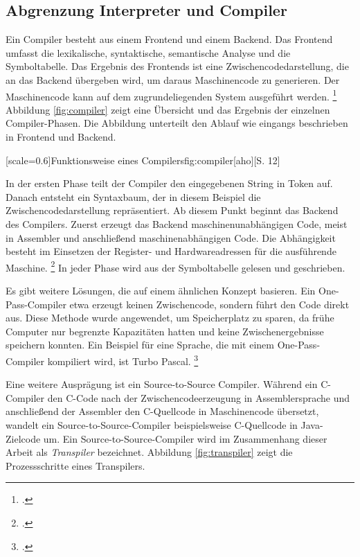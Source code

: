 \subsection{Abgrenzung Interpreter und Compiler}
  
Ein Compiler besteht aus einem Frontend und einem Backend. Das Frontend umfasst die lexikalische, syntaktische, semantische Analyse und die Symboltabelle.
Das Ergebnis des Frontends ist eine Zwischencodedarstellung, die an das Backend übergeben wird, um daraus Maschinencode zu generieren. Der Maschinencode kann auf dem zugrundeliegenden System ausgeführt werden. \footcite[Vgl. ][S.106ff. ]{aho}
Abbildung \ref{fig:compiler} zeigt eine Übersicht und das Ergebnis der einzelnen Compiler-Phasen. Die Abbildung unterteilt den Ablauf wie eingangs beschrieben in Frontend und Backend.

[scale=0.6]{Funktionsweise eines Compilers}{fig:compiler}[aho][S. 12]

In der ersten Phase teilt der Compiler den eingegebenen String in Token auf. Danach entsteht ein Syntaxbaum, der in diesem Beispiel die Zwischencodedarstellung repräsentiert. Ab diesem Punkt beginnt das Backend des Compilers. Zuerst erzeugt das Backend maschinenunabhängigen Code, meist in Assembler und anschließend maschinenabhängigen Code. Die Abhängigkeit besteht im Einsetzen der Register- und Hardwareadressen für die ausführende Maschine.  \footcite[Vgl. ][S.30ff. ]{aho}
In jeder Phase wird aus der Symboltabelle gelesen und geschrieben.

Es gibt weitere Lösungen, die auf einem ähnlichen Konzept basieren.
Ein One-Pass-Compiler etwa erzeugt keinen Zwischencode, sondern führt den Code direkt aus. Diese Methode wurde angewendet, um Speicherplatz zu sparen, da frühe Computer nur begrenzte Kapazitäten hatten und keine Zwischenergebnisse speichern konnten. Ein Beispiel für eine Sprache, die mit einem One-Pass-Compiler kompiliert wird, ist Turbo Pascal. \footcite[Vgl. ][]{onepass}

Eine weitere Ausprägung ist ein Source-to-Source Compiler.
Während ein C-Compiler den C-Code nach der Zwischencodeerzeugung in Assemblersprache und anschließend der Assembler den C-Quellcode in Maschinencode übersetzt, wandelt ein Source-to-Source-Compiler beispielsweise C-Quellcode in Java-Zielcode um. 
Ein Source-to-Source-Compiler wird im Zusammenhang dieser Arbeit als \emph{Transpiler} bezeichnet. Abbildung \ref{fig:transpiler} zeigt die Prozessschritte eines Transpilers.

